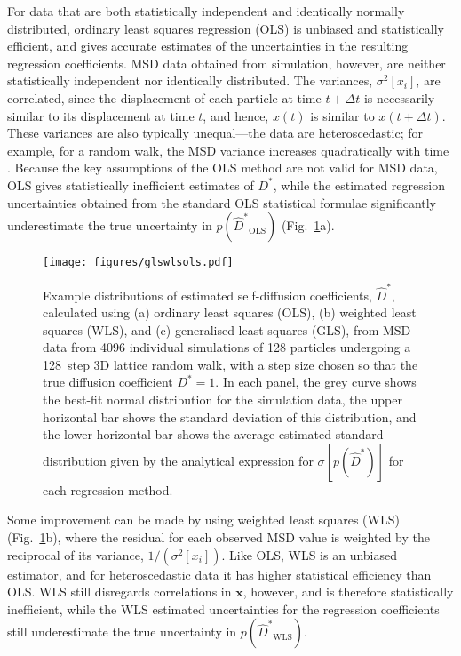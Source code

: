 \documentclass[reprint,superscriptaddress,nobibnotes,amsmath,amssymb,aps,prx,hidelinks]{revtex4-2}
\newcommand{\oMSD}{\ensuremath{\bm{x}}}
\newcommand{\oMSDs}[1]{\ensuremath{x}(#1)}
\newcommand{\oMSDi}{\ensuremath{x_i}}
\newcommand{\prob}[1]{\ensuremath{p(#1)}}
\newcommand{\Dest}{\ensuremath{\widehat{D}^*}}
\newcommand{\D}{\ensuremath{D^*}}
\newcommand{\var}[1]{\ensuremath{\sigma^2[#1]}}
\begin{document}
For data that are both statistically independent and identically normally distributed, ordinary least squares regression (OLS) is unbiased and statistically efficient, and gives accurate estimates of the uncertainties in the resulting regression coefficients.
MSD data obtained from simulation, however, are neither statistically independent nor identically distributed.
The variances, $\var{\oMSDi}$, are correlated, since the displacement of each particle at time $t+\Delta t$ is necessarily similar to its displacement at time $t$, and hence, $\oMSDs{t}$ is similar to $\oMSDs{t+\Delta t}$.
These variances are also typically unequal---the data are heteroscedastic;
for example, for a random walk, the MSD variance increases quadratically with time \cite{smith_random_1996}. 
Because the key assumptions of the OLS method are not valid for MSD data, OLS gives statistically inefficient estimates of $\D$, while the estimated regression uncertainties obtained from the standard OLS statistical formulae significantly underestimate the true uncertainty in $\prob{\Dest_\mathrm{OLS}}$ (Fig.~\ref{fig:glswlsols}a).

\begin{figure}
    \centering
    \texttt{[image: figures/glswlsols.pdf]}
    \caption{
        Example distributions of estimated self-diffusion coefficients, $\Dest$, calculated using (a) ordinary least squares (OLS), (b) weighted least squares (WLS), and (c) generalised least squares (GLS),
        from MSD data from \num{4096} individual simulations of \num{128} particles undergoing a \SI{128}{step} 3D lattice random walk, with a step size chosen so that the true diffusion coefficient $\D = 1$.
        In each panel, the grey curve shows the best-fit normal distribution for the simulation data, the upper horizontal bar shows the standard deviation of this distribution, and the lower horizontal bar shows the average estimated standard distribution given by the analytical expression for $\sigma[\prob{\Dest}]$ for each regression method.}
    \label{fig:glswlsols}
\end{figure}

Some improvement can be made by using weighted least squares (WLS) (Fig.~\ref{fig:glswlsols}b), where the residual for each observed MSD value is weighted by the reciprocal of its variance, $1/(\var{\oMSDi})$.
Like OLS, WLS is an unbiased estimator, and for heteroscedastic data it has higher statistical efficiency than OLS.
WLS still disregards correlations in $\oMSD$, however, and is therefore statistically inefficient, while the WLS estimated uncertainties for the regression coefficients still underestimate the true uncertainty in $\prob{\Dest_\mathrm{WLS}}$.
\end{document}
